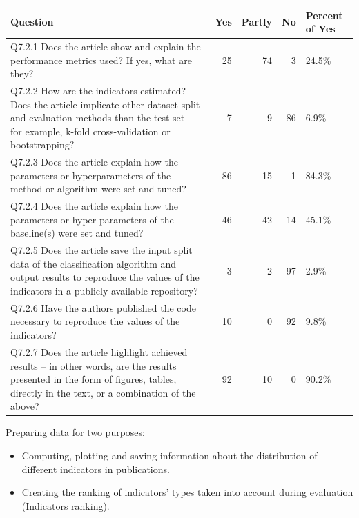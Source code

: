 \documentclass[
]{article}
\providecommand{\tightlist}{%
  \setlength{\itemsep}{0pt}\setlength{\parskip}{0pt}}
\begin{document}
\begin{tabular}{l|r|r|r|l}
\hline
Question & Yes & Partly & No & Percent of Yes\\
\hline
Q7.2.1 Does the article show and explain the performance metrics used? If yes, what are they? & 25 & 74 & 3 & 24.5\%\\
\hline
Q7.2.2 How are the indicators estimated? Does the article implicate other dataset split and evaluation methods than the test set – for example, k-fold cross-validation or bootstrapping? & 7 & 9 & 86 & 6.9\%\\
\hline
Q7.2.3 Does the article explain how the parameters or hyperparameters of the method or algorithm were set and tuned? & 86 & 15 & 1 & 84.3\%\\
\hline
Q7.2.4 Does the article explain how the parameters or hyper-parameters of the baseline(s) were set and tuned? & 46 & 42 & 14 & 45.1\%\\
\hline
Q7.2.5 Does the article save the input split data of the classification algorithm and output results to reproduce the values of the indicators in a publicly available repository? & 3 & 2 & 97 & 2.9\%\\
\hline
Q7.2.6 Have the authors published the code necessary to reproduce the values of the indicators? & 10 & 0 & 92 & 9.8\%\\
\hline
Q7.2.7 Does the article highlight achieved results – in other words, are the results presented in the form of figures, tables, directly in the text, or a combination of the above? & 92 & 10 & 0 & 90.2\%\\
\hline
\end{tabular}

Preparing data for two purposes:

\begin{itemize}
\tightlist
\item
  Computing, plotting and saving information about the distribution of different indicators in publications.
\item
  Creating the ranking of indicators' types taken into account during evaluation (Indicators ranking).
\end{itemize}
\end{document}
